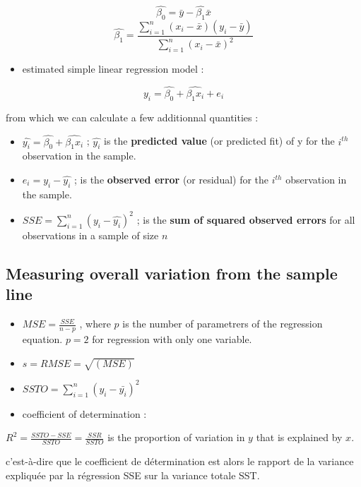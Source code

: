 \documentclass[
]{report}
\providecommand{\tightlist}{%
  \setlength{\itemsep}{0pt}\setlength{\parskip}{0pt}}
\begin{document}
\[\hat{\beta_0}= \bar{y} - \hat{\beta_1}\bar{x}\]
\[\hat{\beta_1}= \frac{\sum_{i=1}^n(x_i -\bar{x})(y_i -\bar{y})}{\sum_{i=1}^n(x_i -\bar{x})^2}\]

\begin{itemize}
\tightlist
\item
  estimated simple linear regression model :
\end{itemize}

\[y_i = \hat{\beta_0} + \hat{\beta_1x_i} +  e_i\]

from which we can calculate a few additionnal quantities :

\begin{itemize}
\item
  \(\hat{y_i} = \hat{\beta_0} + \hat{\beta_1x_i}\) ; \(\hat{y_i}\) is the \textbf{predicted value} (or predicted fit) of y for the \(i^{th}\) observation in the sample.
\item
  \(e_i=y_i -\hat{y_i}\) ; is the \textbf{observed error} (or residual) for the \(i^{th}\) observation in the sample.
\item
  \(SSE = \sum_{i=1}^n (y_i -\hat{y_i})^2\) ; is the \textbf{sum of squared observed errors} for all observations in a sample of size \(n\)
\end{itemize}

\hypertarget{measuring-overall-variation-from-the-sample-line}{%
\subsection{Measuring overall variation from the sample line}\label{measuring-overall-variation-from-the-sample-line}}

\begin{itemize}
\item
  \(MSE = \frac{SSE}{n-p}\) , where \(p\) is the number of parametrers of the regression equation. \(p=2\) for regression with only one variable.
\item
  \(s = RMSE = \sqrt{(MSE)}\)
\item
  \(SSTO=\sum_{i=1}^n (y_i -\bar{y_i})^2\)
\item
  coefficient of determination :
\end{itemize}

\(R^2 = \frac{SSTO-SSE}{SSTO} = \frac{SSR}{SSTO}\) is the proportion of variation in \(y\) that is explained by \(x\).

c'est-à-dire que le coefficient de détermination est alors le rapport de la variance expliquée par la régression SSE sur la variance totale SST.
\end{document}
